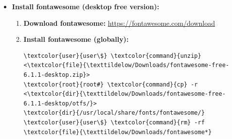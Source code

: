 \documentclass[10pt, a4paper, onecolumn, oneside, titlepage, openany]{book}
\begin{document}
\begin{itemize}
\begin{enumerate}
\begin{Verbatim}[commandchars=\\\{\}]
\end{Verbatim}
        \item \textbf{Download font (TTF or OTF).}
        \item \textbf{Move font to the directory:}
        \begin{itemize}
            \item \textbf{Global:}
\begin{Verbatim}[commandchars=\\\{\}]
\textcolor{root}{root#} \textcolor{command}{mv} <\textcolor{file}{FONT}> <\textcolor{dir}{/usr/local/share/fonts/}>
\end{Verbatim}
            \item \textbf{Local:}
\begin{Verbatim}[commandchars=\\\{\}]
\textcolor{user}{user\$} \textcolor{command}{mv} <\textcolor{file}{FONT}> <\textcolor{dir}{\texttildelow/.local/share/fonts/}>
\end{Verbatim}
        \end{itemize}
    \end{enumerate}
    \item \textbf{Install fontawesome (desktop free version):}
    \begin{enumerate}
        \item \textbf{Download fontawesome:}
\newline \url{https://fontawesome.com/download}
        \item \textbf{Install fontawesome (globally):}
\begin{Verbatim}[commandchars=\\\{\}]
\textcolor{user}{user\$} \textcolor{command}{unzip} <\textcolor{file}{\texttildelow/Downloads/fontawesome-free-6.1.1-desktop.zip}>
\textcolor{root}{root#} \textcolor{command}{cp} -r <\textcolor{dir}{\texttildelow/Downloads/fontawesome-free-6.1.1-desktop/otfs/}>
\textcolor{dir}{/usr/local/share/fonts/fontawesome/}
\textcolor{user}{user\$} \textcolor{command}{rm} -rf \textcolor{file}{\texttildelow/Downloads/fontawesome*}
\end{Verbatim}
    \end{enumerate}
\end{itemize}
\end{document}
